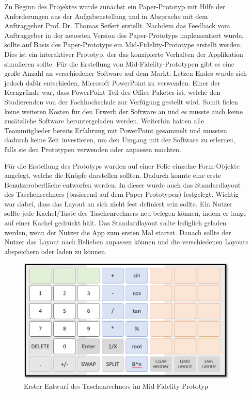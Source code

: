 Zu Beginn des Projektes wurde zunächst ein Paper-Prototyp mit Hilfe der Anforderungen aus der Aufgabenstellung und in Absprache mit dem Auftraggeber Prof. Dr. Thomas Seifert erstellt. Nachdem das Feedback vom Auftraggeber in der neuesten Version des Paper-Prototyps implementiert wurde, sollte auf Basis des Paper-Prototyps ein Mid-Fidelity-Prototype erstellt werden. Dies ist ein interaktiver Prototyp, der das konzipierte Verhalten der Applikation simulieren sollte. Für die Erstellung von Mid-Fidelity-Prototypen gibt es eine große Anzahl an verschiedener Software auf dem Markt. Letzen Endes wurde sich jedoch dafür entschieden, Microsoft PowerPoint zu verwenden. Einer der Kerngründe war, dass PowerPoint Teil des Office Paketes ist, welche den Studierenden von der Fachhochschule zur Verfügung gestellt wird. Somit fielen keine weiteren Kosten für den Erwerb der Software an und es musste auch keine zusätzliche Software heruntergeladen werden. Weiterhin hatten alle Teammitglieder bereits Erfahrung mit PowerPoint gesammelt und mussten dadurch keine Zeit investieren, um den Umgang mit der Software zu erlernen, falls sie den Prototypen verwenden oder anpassen möchten.  

Für die Erstellung des Prototyps wurden auf einer Folie einzelne Form-Objekte angelegt, welche die Knöpfe darstellen sollten. Dadurch konnte eine erste Benutzeroberfläche entworfen werden. In dieser wurde auch das Standardlayout des Taschenrechners (basierend auf dem Paper Prototypen) festgelegt. Wichtig war dabei, dass das Layout an sich nicht fest definiert sein sollte. Ein Nutzer sollte jede Kachel/Taste des Taschenrechners neu belegen können, indem er lange auf einer Kachel gedrückt hält. Das Standardlayout sollte lediglich geladen werden, wenn der Nutzer die App zum ersten Mal startet. Danach sollte der Nutzer das Layout nach Belieben anpassen können und die verschiedenen Layouts abspeichern oder laden zu können.  

\begin{figure}[!h]
	\includegraphics[scale=1]{img/erster-entwurf-mid-fidelty-prototyp}
	\caption[Erster Entwurf des Taschenrechners im Mid-Fidelity-Prototyp]{Erster Entwurf des Taschenrechners im Mid-Fidelity-Prototyp\footnotemark}
\end{figure}

